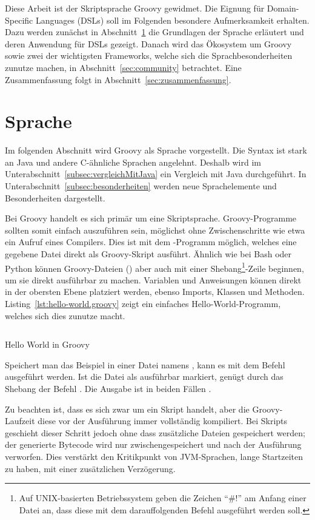 \documentclass[a4paper]{article}
\newcommand{\codelisting}[3]{\begin{listing}[htp]
	\inputminted{#1}{#1/#2}
	\vspace{-3ex}
	\caption{#3}
	\label{lst:#2}
\end{listing}}
\begin{document}
Diese Arbeit ist der Skriptsprache Groovy gewidmet.
Die Eignung für Domain-Specific Languages (DSLs) soll im Folgenden besondere Aufmerksamkeit erhalten.
Dazu werden zunächst in Abschnitt~\ref{sec:sprache} die Grundlagen der Sprache erläutert und deren Anwendung für DSLs gezeigt.
Danach wird das Ökosystem um Groovy sowie zwei der wichtigsten Frameworks, welche sich die Sprachbesonderheiten zunutze machen, in Abschnitt~\ref{sec:community} betrachtet.
Eine Zusammenfassung folgt in Abschnitt~\ref{sec:zusammenfassung}.


\section{Sprache}\label{sec:sprache}

Im folgenden Abschnitt wird Groovy als Sprache vorgestellt.
Die Syntax ist stark an Java und andere C-ähnliche Sprachen angelehnt.
Deshalb wird im Unterabschnitt~\ref{subsec:vergleichMitJava} ein Vergleich mit Java durchgeführt.
In Unterabschnitt~\ref{subsec:besonderheiten} werden neue Sprachelemente und Besonderheiten dargestellt.

Bei Groovy handelt es sich primär um eine Skriptsprache.
Groovy-Programme sollten somit einfach auszuführen sein, möglichst ohne Zwischenschritte wie etwa ein Aufruf eines Compilers.
Dies ist mit dem -Programm möglich, welches eine gegebene Datei direkt als Groovy-Skript ausführt.
Ähnlich wie bei Bash oder Python können Groovy-Dateien () aber auch mit einer Shebang\footnote{Auf UNIX-basierten Betriebssystem geben die Zeichen ``\#!'' am Anfang einer Datei an, dass diese mit dem darauffolgenden Befehl ausgeführt werden soll.}-Zeile beginnen, um sie direkt ausführbar zu machen.
Variablen und Anweisungen können direkt in der obersten Ebene platziert werden, ebenso Imports, Klassen und Methoden.
Listing~\ref{lst:hello-world.groovy} zeigt ein einfaches Hello-World-Programm, welches sich dies zunutze macht.

\codelisting{groovy}{hello-world.groovy}{Hello World in Groovy}

Speichert man das Beispiel in einer Datei namens , kann es mit dem Befehl  ausgeführt werden.
Ist die Datei als ausführbar markiert, genügt durch das Shebang der Befehl .
Die Ausgabe ist in beiden Fällen .

Zu beachten ist, dass es sich zwar um ein Skript handelt, aber die Groovy-Laufzeit diese vor der Ausführung immer vollständig kompiliert.
Bei Skripts geschieht dieser Schritt jedoch ohne dass zusätzliche Dateien gespeichert werden;
der generierte Bytecode wird nur zwischengespeichert und nach der Ausführung verworfen.
Dies verstärkt den Kritikpunkt von JVM-Sprachen, lange Startzeiten zu haben, mit einer zusätzlichen Verzögerung.
\end{document}
